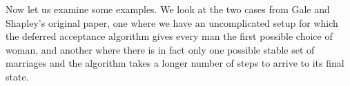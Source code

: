 {\begin{itemize}
\begin{code}
\AgdaSpace{}%
\AgdaSpace{}%
\AgdaSpace{}%
\<%
\\
\>[0]%
\>[16]\AgdaSymbol{|}\AgdaSpace{}%
\AgdaSpace{}%
\AgdaSpace{}%
\AgdaSpace{}%
\AgdaSpace{}%
\AgdaSpace{}%
\AgdaSpace{}%
\AgdaSymbol{(}\AgdaSpace{}%
\AgdaSpace{}%
\AgdaSymbol{)}\<%
\\
\>[0]%
\>[16]\AgdaSymbol{|}\AgdaSpace{}%
%
\>[24]\AgdaSymbol{=}\AgdaSpace{}%
\AgdaSpace{}%
\AgdaSpace{}%
\AgdaSpace{}%
\AgdaSpace{}%
\AgdaSpace{}%
\<%
\\
\>[0]%
\>[16]\AgdaSymbol{|}\AgdaSpace{}%
\AgdaSpace{}%
\AgdaSymbol{=}\AgdaSpace{}%
\AgdaSpace{}%
\AgdaSymbol{(}\AgdaSpace{}%
\AgdaSymbol{\AgdaUnderscore{})}\<%
\\
\>[0]\AgdaSpace{}%
\AgdaSymbol{(}\AgdaSpace{}%
\AgdaSpace{}%
\AgdaSymbol{((}\AgdaSpace{}%
\AgdaOperator{\AgdaInductiveConstructor{,}}\AgdaSpace{}%
\AgdaSpace{}%
\AgdaSpace{}%
\AgdaSymbol{)}\AgdaSpace{}%
\AgdaSpace{}%
\AgdaSymbol{)}\AgdaSpace{}%
\AgdaSpace{}%
\AgdaSpace{}%
\AgdaSpace{}%
\AgdaSpace{}%
\AgdaSymbol{)}\AgdaSpace{}%
\AgdaSymbol{|}\AgdaSpace{}%
\AgdaSpace{}%
\AgdaSymbol{=}\AgdaSpace{}%
\AgdaSpace{}%
\AgdaSpace{}%
\AgdaSpace{}%
\AgdaSpace{}%
\<%
\\
\>[0]\<%
\end{code}

Now let us examine some examples. We look at the two cases from Gale and Shapley's original paper, one where we have an uncomplicated setup for which the deferred acceptance algorithm gives every man the first possible choice of woman, and another where there is in fact only one possible stable set of marriages and the algorithm takes a longer number of steps to arrive to its final state.


\end{itemize}}
